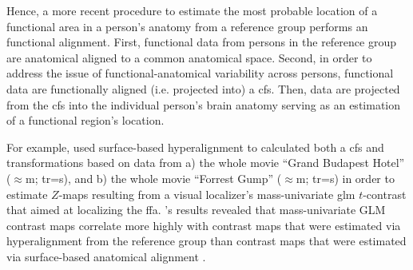 


%
Hence, a more recent procedure \citep[e.g., ][]{jiahui2020predicting,
guntupalli2016model, haxby2011common} to estimate the most probable location of
a functional area in a person's anatomy from a reference group performs an
functional alignment.
First, functional data from persons in the reference group are anatomical
aligned to a common anatomical space.
%
Second, in order to address the issue of functional-anatomical variability
across persons, functional data are functionally aligned (i.e. projected into) a
\ac{cfs}.
%
Then, data are projected from the \ac{cfs} into the individual person's brain
anatomy serving as an estimation of a functional region's location.

For example, \citet{jiahui2020predicting} used surface-based hyperalignment to
calculated both a \ac{cfs} and transformations based on data from
%
a) the whole movie ``Grand Budapest Hotel'' ($\approx$\unit[50]{m};
\ac{tr}=\unit[1]{s}), and
%
b) the whole movie ``Forrest Gump'' ($\approx$\unit[120]{m};
\ac{tr}=\unit[2]{s})
%
in order to estimate $Z$-maps resulting from a visual localizer's
mass-univariate \ac{glm} $t$-contrast that aimed at localizing the \ac{ffa}.
\citet{jiahui2020predicting}'s results revealed that mass-univariate GLM
contrast maps correlate more highly with contrast maps that were estimated via
hyperalignment from the reference group than contrast maps that were estimated
via surface-based anatomical alignment \citep{jiahui2020predicting}.




